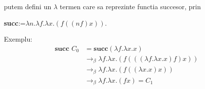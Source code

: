 putem defini un $\lambda$ termen care sa reprezinte functia succesor, prin
\begin{center}
	\textbf{succ}:=$\lambda n.\lambda f.\lambda x.(f((nf)x))$.
\end{center}
Exemplu:
\begin{align*}
	\textbf{succ } C_0 & = \textbf{succ} (\lambda f.\lambda x.x)                        \\
	                   & \to_\beta \lambda f.\lambda x.(f(((\lambda f.\lambda x.x)f)x)) \\
	                   & \to_\beta \lambda f.\lambda x.(f((\lambda x.x)x))              \\
	                   & \to_\beta \lambda f.\lambda x.(fx) = C_1
\end{align*}

